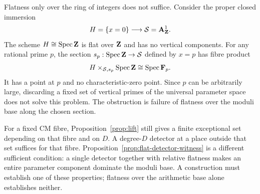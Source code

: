 Flatness only over the ring of integers does not suffice. Consider the proper closed immersion
\[
 H=\{x=0\}\longrightarrow\mathcal S=\mathbf A^1_\mathbf Z.
\]
The scheme $H\cong\operatorname{Spec}\mathbf Z$ is flat over $\mathbf Z$ and has no vertical components. For any rational prime $p$, the section $s_p:\operatorname{Spec}\mathbf Z\to\mathcal S$ defined by $x=p$ has fibre product
\[
 H\times_{\mathcal S,s_p}\operatorname{Spec}\mathbf Z\cong\operatorname{Spec}\mathbf F_p.
\]
It has a point at $p$ and no characteristic-zero point. Since $p$ can be arbitrarily large, discarding a fixed set of vertical primes of the universal parameter space does not solve this problem. The obstruction is failure of flatness over the moduli base along the chosen section.

For a fixed CM fibre, Proposition~\ref{prop:lift} still gives a finite exceptional set depending on that fibre and on $D$. A degree-$D$ detector at a place outside that set suffices for that fibre. Proposition~\ref{prop:flat-detector-witness} is a different sufficient condition: a single detector together with relative flatness makes an entire parameter component dominate the moduli base. A construction must establish one of these properties; flatness over the arithmetic base alone establishes neither.
